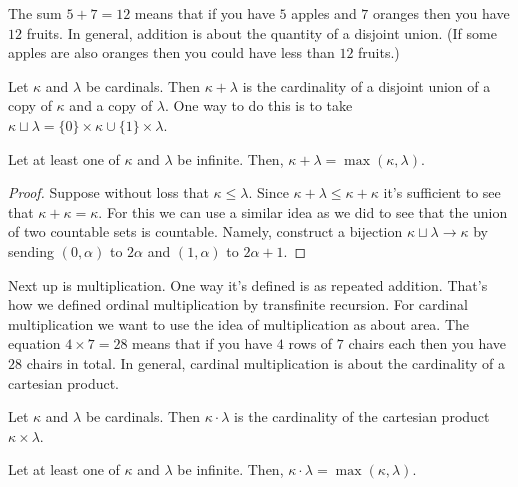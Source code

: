 \documentclass[10pt]{amsart}
\begin{document}
The sum $5 + 7 = 12$ means that if you have $5$ apples and $7$ oranges then you have $12$ fruits. In general, addition is about the quantity of a disjoint union. (If some apples are also oranges then you could have less than $12$ fruits.)

\begin{definition}
Let $\kappa$ and $\lambda$ be cardinals. Then $\kappa + \lambda$ is the cardinality of a disjoint union of a copy of $\kappa$ and a copy of $\lambda$. One way to do this is to take $\kappa \sqcup \lambda = \{0\} \times \kappa \cup \{1\} \times \lambda$.
\end{definition}

\begin{lemma}
Let at least one of $\kappa$ and $\lambda$ be infinite. Then, 
$\kappa + \lambda = \max(\kappa,\lambda)$. 
\end{lemma}

\begin{proof}
Suppose without loss that $\kappa \le \lambda$. Since $\kappa + \lambda \le \kappa + \kappa$ it's sufficient to see that $\kappa + \kappa = \kappa$. For this we can use a similar idea as we did to see that the union of two countable sets is countable. Namely, construct a bijection $\kappa \sqcup \lambda \to \kappa$ by sending $(0,\alpha)$ to $2\alpha$ and $(1,\alpha)$ to $2\alpha+1$. 
\end{proof}

Next up is multiplication. One way it's defined is as repeated addition. That's how we defined ordinal multiplication by transfinite recursion. For cardinal multiplication we want to use the idea of multiplication as about area. The equation $4 \times 7 = 28$ means that if you have $4$ rows of $7$ chairs each then you have $28$ chairs in total. In general, cardinal multiplication is about the cardinality of a cartesian product.

\begin{definition}
Let $\kappa$ and $\lambda$ be cardinals. Then $\kappa \cdot \lambda$ is the cardinality of the cartesian product $\kappa \times \lambda$.
\end{definition}

\begin{lemma}
Let at least one of $\kappa$ and $\lambda$ be infinite. Then,
$\kappa \cdot \lambda = \max(\kappa,\lambda)$.
\end{lemma}
\end{document}
